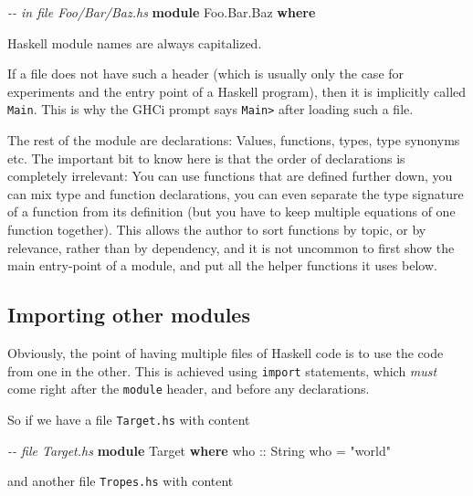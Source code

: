 \documentclass[11pt,
  american,
  DIV13]{article}
\newenvironment{Shaded}{}{}
\newcommand{\CommentTok}[1]{\textcolor[rgb]{0.38,0.63,0.69}{\textit{#1}}}
\newcommand{\DataTypeTok}[1]{\textcolor[rgb]{0.56,0.13,0.00}{#1}}
\newcommand{\KeywordTok}[1]{\textcolor[rgb]{0.00,0.44,0.13}{\textbf{#1}}}
\newcommand{\NormalTok}[1]{#1}
\newcommand{\OtherTok}[1]{\textcolor[rgb]{0.00,0.44,0.13}{#1}}
\newcommand{\StringTok}[1]{\textcolor[rgb]{0.25,0.44,0.63}{#1}}
\begin{document}
\begin{Shaded}
\begin{Highlighting}[]
\CommentTok{{-}{-} in file Foo/Bar/Baz.hs}
\KeywordTok{module} \DataTypeTok{Foo.Bar.Baz} \KeywordTok{where}
\end{Highlighting}
\end{Shaded}

Haskell module names are always capitalized.

If a file does not have such a header (which is usually only the case
for experiments and the entry point of a Haskell program), then it is
implicitly called \texttt{Main}. This is why the GHCi prompt says
\texttt{Main\textgreater{}} after loading such a file.

The rest of the module are declarations: Values, functions, types, type
synonyms etc. The important bit to know here is that the order of
declarations is completely irrelevant: You can use functions that are
defined further down, you can mix type and function declarations, you
can even separate the type signature of a function from its definition
(but you have to keep multiple equations of one function together). This
allows the author to sort functions by topic, or by relevance, rather
than by dependency, and it is not uncommon to first show the main
entry-point of a module, and put all the helper functions it uses below.

\hypertarget{importing-other-modules}{%
\subsection{Importing other modules}\label{importing-other-modules}}

Obviously, the point of having multiple files of Haskell code is to use
the code from one in the other. This is achieved using \texttt{import}
statements, which \emph{must} come right after the \texttt{module}
header, and before any declarations.

So if we have a file \texttt{Target.hs} with content

\begin{Shaded}
\begin{Highlighting}[]
\CommentTok{{-}{-} file Target.hs}
\KeywordTok{module} \DataTypeTok{Target} \KeywordTok{where}
\OtherTok{who ::} \DataTypeTok{String}
\NormalTok{who }\OtherTok{=} \StringTok{"world"}
\end{Highlighting}
\end{Shaded}

and another file \texttt{Tropes.hs} with content
\end{document}
